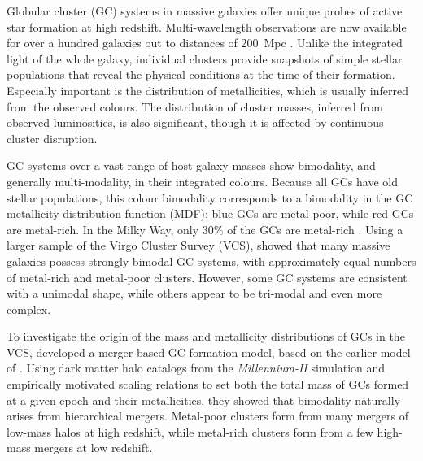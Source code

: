 \documentclass[fleqn,usenatbib]{mnras}
\begin{document}
Globular cluster (GC) systems in massive galaxies offer unique probes of active star formation at high redshift. Multi-wavelength observations are now available for over a hundred galaxies out to distances of 200~Mpc \citep[e.g.,][]{peng_etal06, harris_etal16_bcg2,harris_etal17_bcg3}. Unlike the integrated light of the whole galaxy, individual clusters provide snapshots of simple stellar populations that reveal the physical conditions at the time of their formation. Especially important is the distribution of metallicities, which is usually inferred from the observed colours. The distribution of cluster masses, inferred from observed luminosities, is also significant, though it is affected by continuous cluster disruption.

GC systems over a vast range of host galaxy masses show bimodality, and generally multi-modality, in their integrated colours. Because all GCs have old stellar populations, this colour bimodality corresponds to a bimodality in the GC metallicity distribution function (MDF): blue GCs are metal-poor, while red GCs are metal-rich. In the Milky Way, only 30\% of the GCs are metal-rich \citep{harris96}. Using a larger sample of the Virgo Cluster Survey (VCS), \citet{peng_etal06} showed that many massive galaxies possess strongly bimodal GC systems, with approximately equal numbers of metal-rich and metal-poor clusters. However, some GC systems are consistent with a unimodal shape, while others appear to be tri-modal and even more complex.

To investigate the origin of the mass and metallicity distributions of GCs in the VCS, \citet[][hereafter LG14]{li_gnedin14} developed a merger-based GC formation model, based on the earlier model of \citet[][hereafter MG10]{muratov_gnedin10}. Using dark matter halo catalogs from the \textit{Millennium-II} simulation and empirically motivated scaling relations to set both the total mass of GCs formed at a given epoch and their metallicities, they showed that bimodality naturally arises from hierarchical mergers. Metal-poor clusters form from many mergers of low-mass halos at high redshift, while metal-rich clusters form from a few high-mass mergers at low redshift.
\end{document}
